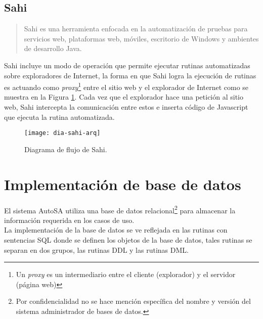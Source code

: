 \subsection{Sahi}\label{sec:sahi}
\begin{quote}
	Sahi es una herramienta enfocada en la automatización de pruebas para servicios web, plataformas web, móviles, escritorio de Windows\textsuperscript{\textcopyright} y ambientes de desarrollo Java\cite{SahiPro}.
\end{quote}

Sahi incluye un modo de operación que permite ejecutar rutinas automatizadas sobre exploradores de Internet, la forma en que Sahi logra la ejecución de rutinas es actuando como \textit{proxy}\footnote{Un \textit{proxy} es un intermediario entre el cliente (explorador) y el servidor (página web)\cite{BeginningUbuntuLinux}} entre el sitio web y el explorador de Internet como se muestra en la Figura \ref{fig:dia-sahi-arq}. Cada vez que el explorador hace una petición al sitio web, Sahi intercepta la comunicación entre estos e inserta código de Javascript que ejecuta la rutina automatizada\cite{WebEng9IntConf, SahiPro}.

\begin{figure}[h]
\centering
\texttt{[image: dia-sahi-arq]}
\caption{Diagrama de flujo de Sahi\cite{SahiPro}.}
\label{fig:dia-sahi-arq}
\end{figure}

%

\section{Implementación de base de datos}\label{sec:impl-db}
El sistema AutoSA utiliza una base de datos relacional\footnote{Por confidencialidad no se hace mención específica del nombre y versión del sistema administrador de bases de datos.} para almacenar la información requerida en los casos de uso.\\
La implementación de la base de datos se ve reflejada en las rutinas con sentencias SQL donde se definen los objetos de la base de datos, tales rutinas se separan en dos grupos, las rutinas DDL y las rutinas DML.

